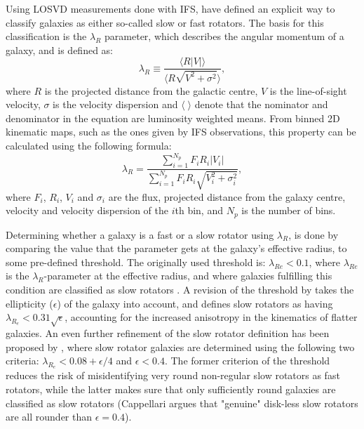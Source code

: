 \documentclass[english, twoside]{HYgradu}
\begin{document}
Using LOSVD measurements done with IFS, \cite{Emsellem2007} have defined an explicit way to classify galaxies as either so-called slow or fast rotators. The basis for this classification is the $\lambda_R$ parameter, which describes the angular momentum of a galaxy, and is defined as:  
\begin{equation}
\lambda_R \equiv \frac{\langle R |V| \rangle}{\langle R \sqrt{V^2 + \sigma^2} \rangle}, \label{eq:general_lambdar}
\end{equation}
where $R$ is the projected distance from the galactic centre, $V$ is the line-of-sight velocity, $\sigma$ is the velocity dispersion and $\langle \; \rangle$ denote that the nominator and denominator in the equation are luminosity weighted means. From binned 2D kinematic maps, such as the ones given by IFS observations, this property can be calculated using the following formula:
\begin{equation}
\lambda_R = \frac{\sum^{N_p}_{i=1} F_i R_i |V_i|}{\sum^{N_p}_{i=1} F_i R_i \sqrt{V_i^2 + \sigma^2_i}}, \label{eq:binned_lambdar}
\end{equation}
where $F_i$, $R_i$, $V_i$ and $\sigma_i$ are the flux, projected distance from the galaxy centre, velocity and velocity dispersion of the $i$th bin, and $N_p$ is the number of bins.

Determining whether a galaxy is a fast or a slow rotator using $\lambda_R$, is done by comparing the value that the parameter gets at the galaxy's effective radius, to some pre-defined threshold. The originally used threshold is: $\lambda_{Re} < 0.1$, where $\lambda_{Re}$ is the $\lambda_R$-parameter at the effective radius, and where galaxies fulfilling this condition are classified as slow rotators \citep{Emsellem2007}. A revision of the threshold by \cite{Emsellem2011} takes the ellipticity ($\epsilon$) of the galaxy into account, and defines slow rotators as having $\lambda_{R_e} < 0.31 \sqrt{\epsilon}$, accounting for the increased anisotropy in the kinematics of flatter galaxies. An even further refinement of the slow rotator definition has been proposed by \cite{Cappellari2016}, where slow rotator galaxies are determined using the following two criteria: $\lambda_{R_e} < 0.08 + \epsilon/4$ and $\epsilon < 0.4$. The former criterion of the threshold reduces the risk of misidentifying very round non-regular slow rotators as fast rotators, while the latter makes sure that only sufficiently round galaxies are classified as slow rotators (Cappellari argues that "genuine" disk-less slow rotators are all rounder than $\epsilon = 0.4$).
\end{document}
